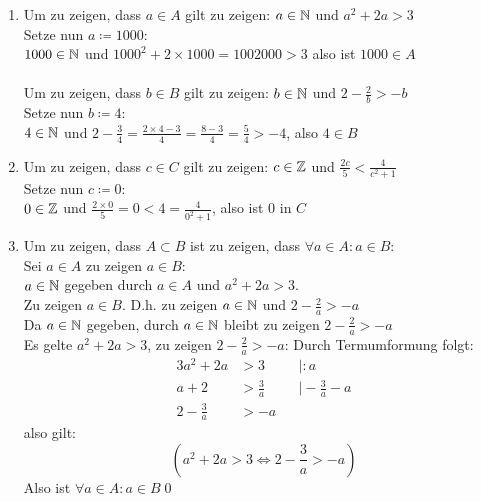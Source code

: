 \documentclass{gadsescript}
\begin{document}
\maketitle
\begin{enumerate}[label=(\alph*)]
	\item Um zu zeigen, dass $ a \in A $ gilt zu zeigen: $ a \in \mathbb{N} $ und $  a^2 + 2a > 3 $\\
		Setze nun $ a \coloneqq 1000 $:\\
		$ 1000 \in \mathbb{N} $ und $ 1000^2 +2 \times 1000 = 1002000 > 3 $ also ist $ 1000 \in A $\\
		~\\
		Um zu zeigen, dass $ b \in B $ gilt zu zeigen: $ b \in \mathbb{N} $ und $  2 - \frac{2}{b} > -b $\\
		Setze nun $ b \coloneqq 4 $:\\
		$4 \in \mathbb{N} $ und $ 2 - \frac{3}{4} = \frac{2\times 4 - 3}{4} = \frac{8-3}{4} = \frac{5}{4} > -4 $, also $ 4 \in B $
	\item \label{item:b}Um zu zeigen, dass $ c \in C $ gilt zu zeigen: $ c \in \mathbb{Z} $ und $ \frac{2c}{5} < \frac{4}{c^2+1}  $\\
		Setze nun $ c \coloneqq 0 $:\\
		$ 0 \in \mathbb{Z} $ und $ \frac{2\times0}{5} = 0 < 4 = \frac{4}{0^2 + 1} $, also ist $ 0 $ in $ C $
	\item \label{item:c}Um zu zeigen, dass $ A \subset B $ ist zu zeigen, dass $ \forall a \in A: a \in B $:\\
		Sei $ a \in A $ zu zeigen $ a \in B $:\\
		$ a \in \mathbb{N} $ gegeben durch $ a \in A $ und $ a^2 + 2a > 3 $.\\
		Zu zeigen $ a \in B $. D.h. zu zeigen $ a \in \mathbb{N} $ und $  2 - \frac{2}{a} > -a $\\
		Da $ a \in \mathbb{N} $ gegeben, durch $ a \in \mathbb{N} $ bleibt zu zeigen $  2 - \frac{2}{a} > -a $\\
		Es gelte $ a^2 + 2a > 3 $, zu zeigen $  2 - \frac{2}{a} > -a $:
		Durch Termumformung folgt:
		\begin{alignat*}{3}
			a^2 + 2a &> 3&&\mid :a\\
			a + 2 &> \frac{3}{a} &&\mid -\frac{3}{a} - a\\
			2 - \frac{3}{a} &> -a &&~
		\end{alignat*}
		also gilt:
		\begin{equation}
			\label{eq:1}
			( a^2 + 2a > 3 \iff 2 - \frac{3}{a} > -a )
		\end{equation}
		Also ist $ \forall a \in A: a \in B $\qed

\end{enumerate}
\end{document}
